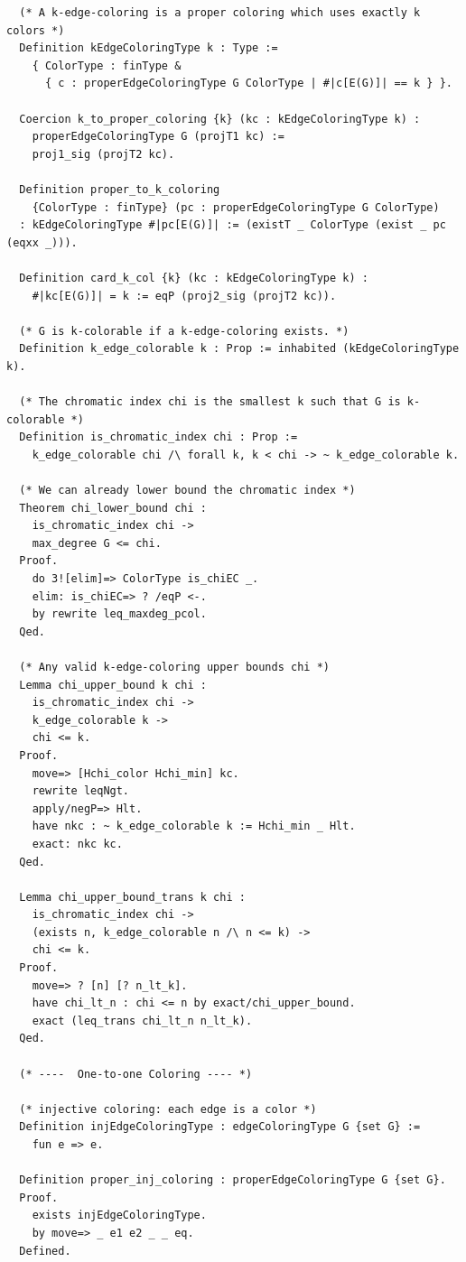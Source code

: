 \begin{verbatim}
  (* A k-edge-coloring is a proper coloring which uses exactly k colors *)
  Definition kEdgeColoringType k : Type := 
    { ColorType : finType &
      { c : properEdgeColoringType G ColorType | #|c[E(G)]| == k } }.

  Coercion k_to_proper_coloring {k} (kc : kEdgeColoringType k) : 
    properEdgeColoringType G (projT1 kc) :=
    proj1_sig (projT2 kc).

  Definition proper_to_k_coloring 
    {ColorType : finType} (pc : properEdgeColoringType G ColorType) 
  : kEdgeColoringType #|pc[E(G)]| := (existT _ ColorType (exist _ pc (eqxx _))).

  Definition card_k_col {k} (kc : kEdgeColoringType k) :
    #|kc[E(G)]| = k := eqP (proj2_sig (projT2 kc)).

  (* G is k-colorable if a k-edge-coloring exists. *)
  Definition k_edge_colorable k : Prop := inhabited (kEdgeColoringType k).

  (* The chromatic index chi is the smallest k such that G is k-colorable *)
  Definition is_chromatic_index chi : Prop :=
    k_edge_colorable chi /\ forall k, k < chi -> ~ k_edge_colorable k.

  (* We can already lower bound the chromatic index *)
  Theorem chi_lower_bound chi : 
    is_chromatic_index chi -> 
    max_degree G <= chi.
  Proof. 
    do 3![elim]=> ColorType is_chiEC _. 
    elim: is_chiEC=> ? /eqP <-.
    by rewrite leq_maxdeg_pcol.
  Qed.

  (* Any valid k-edge-coloring upper bounds chi *)
  Lemma chi_upper_bound k chi :
    is_chromatic_index chi ->
    k_edge_colorable k ->
    chi <= k.
  Proof.
    move=> [Hchi_color Hchi_min] kc.
    rewrite leqNgt.
    apply/negP=> Hlt.
    have nkc : ~ k_edge_colorable k := Hchi_min _ Hlt.
    exact: nkc kc.
  Qed.

  Lemma chi_upper_bound_trans k chi :   
    is_chromatic_index chi ->
    (exists n, k_edge_colorable n /\ n <= k) ->
    chi <= k.
  Proof.
    move=> ? [n] [? n_lt_k].
    have chi_lt_n : chi <= n by exact/chi_upper_bound.
    exact (leq_trans chi_lt_n n_lt_k).
  Qed.

  (* ----  One-to-one Coloring ---- *)

  (* injective coloring: each edge is a color *)
  Definition injEdgeColoringType : edgeColoringType G {set G} :=
    fun e => e.

  Definition proper_inj_coloring : properEdgeColoringType G {set G}.
  Proof.
    exists injEdgeColoringType.
    by move=> _ e1 e2 _ _ eq.
  Defined.


\end{verbatim}

